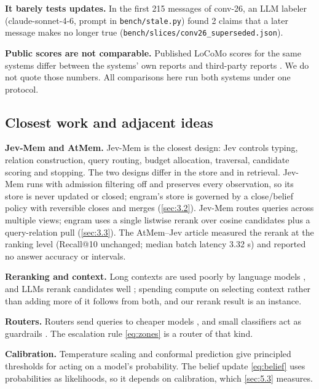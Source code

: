 \documentclass[11pt]{article}
\newcommand{\src}[1]{}
\begin{document}
\textbf{It barely tests updates.} In the first 215\src{bench/results/e2\_jev\_\_stress.json} messages of conv-26, an LLM labeler (claude-sonnet-4-6, prompt in \texttt{bench/\allowbreak{}stale.py}) found 2\src{bench/results/e0\_baseline\_\_stress.json} claims that a later message makes no longer true (\texttt{bench/\allowbreak{}slices/\allowbreak{}conv26\_\allowbreak{}superseded.json}).

\textbf{Public scores are not comparable.} Published LoCoMo scores for the same systems differ between the systems' own reports and third-party reports \citep{mem0blog2026benchmarks,byteroverblog2026benchmark}. We do not quote those numbers. All comparisons here run both systems under one protocol.

\subsection{Closest work and adjacent ideas}\label{sec:2.4}
\textbf{Jev-Mem and AtMem.} Jev-Mem \citep{jiang2026jevmem} is the closest design: Jev controls typing, relation construction, query routing, budget allocation, traversal, candidate scoring and stopping. The two designs differ in the store and in retrieval. Jev-Mem runs with admission filtering off and preserves every observation, so its store is never updated or closed; engram's store is governed by a close/belief policy with reversible closes and merges (\cref{sec:3.2}). Jev-Mem routes queries across multiple views; engram uses a single listwise rerank over cosine candidates plus a query-relation pull (\cref{sec:3.3}). The AtMem--Jev article \citep{taghia2026atmem} measured the rerank at the ranking level (Recall@10 unchanged; median batch latency 3.32\src{taghia2026atmem (median batch latency, s)} s) and reported no answer accuracy or intervals.

\textbf{Reranking and context.} Long contexts are used poorly by language models \citep{liu2024lost}, and LLMs rerank candidates well \citep{sun2023rankgpt}; spending compute on selecting context rather than adding more of it follows from both, and our rerank result is an instance.

\textbf{Routers.} Routers send queries to cheaper models \citep{ong2025routellm,chen2024frugalgpt}, and small classifiers act as guardrails \citep{inan2023llamaguard}. The escalation rule \cref{eq:zones} is a router of that kind.

\textbf{Calibration.} Temperature scaling \citep{guo2017calibration} and conformal prediction \citep{angelopoulos2021conformal} give principled thresholds for acting on a model's probability. The belief update \cref{eq:belief} uses probabilities as likelihoods, so it depends on calibration, which \cref{sec:5.3} measures.
\end{document}
